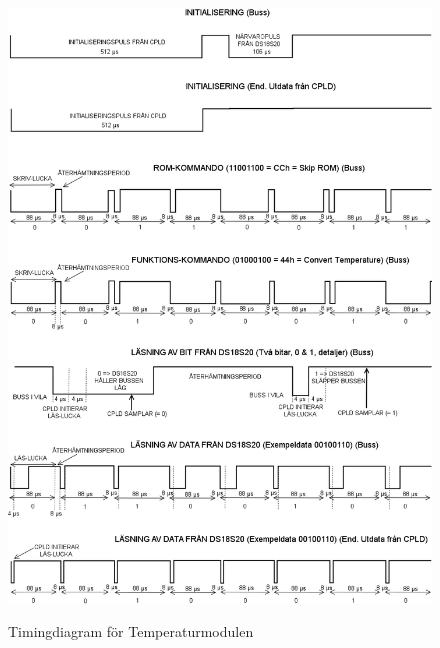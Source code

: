 \documentclass[a4paper,11pt]{article}
\begin{document}
		\begin{figure}[ht!tb]
		  \centering
		      \includegraphics[scale=0.5, angle=0]{TempTiming.png}
			\label{fig:TempTiming}
		  	\caption{Timingdiagram för Temperaturmodulen}
		\end{figure}
\end{document}
